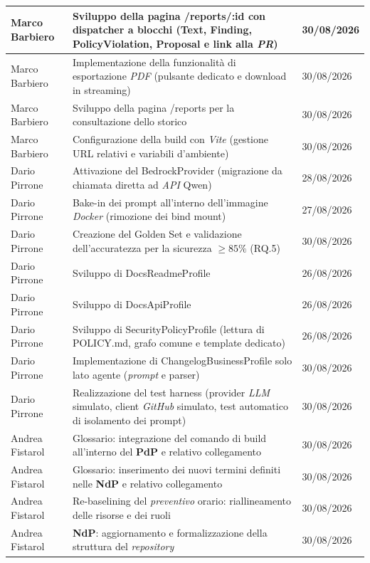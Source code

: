 \documentclass[12pt, a4paper]{article}
\begin{document}
\begin{xltabular}{\textwidth}{|l|X|l|}
    Marco Barbiero & Sviluppo della pagina /reports/:id con dispatcher a blocchi (Text, Finding, PolicyViolation, Proposal e link alla \textit{PR}) & 30/08/2026 \\ \hline
    Marco Barbiero & Implementazione della funzionalità di esportazione \textit{PDF} (pulsante dedicato e download in streaming) & 30/08/2026 \\ \hline
    Marco Barbiero & Sviluppo della pagina /reports per la consultazione dello storico & 30/08/2026 \\ \hline
    Marco Barbiero & Configurazione della build con \textit{Vite} (gestione URL relativi e variabili d'ambiente) & 30/08/2026 \\ \hline
    Dario Pirrone & Attivazione del BedrockProvider (migrazione da chiamata diretta ad \textit{API} Qwen) & 28/08/2026 \\ \hline
    Dario Pirrone & Bake-in dei prompt all'interno dell'immagine \textit{Docker} (rimozione dei bind mount) & 27/08/2026 \\ \hline
    Dario Pirrone & Creazione del Golden Set e validazione dell'accuratezza per la sicurezza $\ge 85\%$ (RQ.5) & 30/08/2026 \\ \hline
    Dario Pirrone & Sviluppo di DocsReadmeProfile& 26/08/2026 \\ \hline
    Dario Pirrone & Sviluppo di DocsApiProfile  & 26/08/2026 \\ \hline
    Dario Pirrone & Sviluppo di SecurityPolicyProfile (lettura di POLICY.md, grafo comune e template dedicato) & 26/08/2026 \\ \hline
    Dario Pirrone & Implementazione di ChangelogBusinessProfile solo lato agente (\textit{prompt} e parser) & 30/08/2026 \\ \hline
    Dario Pirrone & Realizzazione del test harness (provider \textit{LLM} simulato, client \textit{GitHub} simulato, test automatico di isolamento dei prompt) & 30/08/2026 \\ \hline
    Andrea Fistarol & Glossario: integrazione del comando di build all'interno del \textbf{PdP} e relativo collegamento & 30/08/2026 \\ \hline
    Andrea Fistarol & Glossario: inserimento dei nuovi termini definiti nelle \textbf{NdP} e relativo collegamento & 30/08/2026 \\ \hline
    Andrea Fistarol & Re-baselining del \textit{preventivo} orario: riallineamento delle risorse e dei ruoli & 30/08/2026 \\ \hline
    Andrea Fistarol & \textbf{NdP}: aggiornamento e formalizzazione della struttura del \textit{repository} & 30/08/2026 \\ \hline

\end{xltabular}
\end{document}
